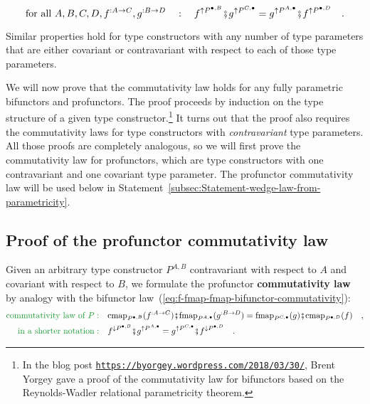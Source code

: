 ~\vspace{-0.5\baselineskip}
\[
\text{for all }A,B,C,D,f^{:A\rightarrow C},g^{:B\rightarrow D}\quad:\quad f^{\uparrow P^{\bullet,B}}\bef g^{\uparrow P^{C,\bullet}}=g^{\uparrow P^{A,\bullet}}\bef f^{\uparrow P^{\bullet,D}}\quad.
\]

Similar properties hold for type constructors with any number of type
parameters that are either covariant or contravariant with respect
to each of those type parameters.

We will now prove that the commutativity law holds for any fully parametric
bifunctors and profunctors. The proof proceeds by induction on the
type structure of a given type constructor.\footnote{In the blog post \texttt{\href{https://byorgey.wordpress.com/2018/03/30/}{https://byorgey.wordpress.com/2018/03/30/}},
Brent Yorgey gave a proof of the commutativity
law for bifunctors based on the Reynolds-Wadler relational parametricity
theorem. } It turns out that the proof also requires the commutativity laws
for type constructors with \emph{contravariant} type parameters. All
those proofs are completely analogous, so we will first prove the
commutativity law for profunctors, which are type constructors with
one contravariant and one covariant type parameter. The profunctor
commutativity law will be used below in Statement~\ref{subsec:Statement-wedge-law-from-parametricity}.

\subsection{Proof of the profunctor commutativity law\label{subsec:Proof-of-the-profunctor-commutativity-law}}

Given an arbitrary type constructor $P^{A,B}$ contravariant with
respect to $A$ and covariant with respect to $B$, we formulate the
profunctor \textbf{commutativity law}
by analogy with the bifunctor law~(\ref{eq:f-fmap-fmap-bifunctor-commutativity}):
\begin{align}
{\color{greenunder}\text{commutativity law of }P:}\quad & \text{cmap}_{P^{\bullet,B}}(f^{:A\rightarrow C})\bef\text{fmap}_{P^{A,\bullet}}(g^{:B\rightarrow D})=\text{fmap}_{P^{C,\bullet}}(g)\bef\text{cmap}_{P^{\bullet,D}}(f)\quad,\nonumber \\
{\color{greenunder}\text{in a shorter notation}:}\quad & f^{\downarrow P^{\bullet,B}}\bef g^{\uparrow P^{A,\bullet}}=g^{\uparrow P^{C,\bullet}}\bef f^{\downarrow P^{\bullet,D}}\quad.\label{eq:profunctor-commutativity-law}
\end{align}

